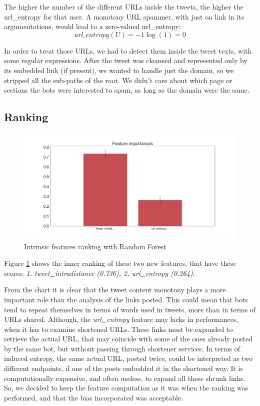 The higher the number of the different URLs inside the tweets, the higher the url\_entropy for that user.
A monotony URL spammer, with just on link in its argumentations, would lead to a zero-valued url\_entropy:
\[url\_entropy(U) = -1\log(1) = 0\]

In order to treat those URLs, we had to detect them inside the tweet texts, with some regular expressions. After the tweet was cleansed and represented only by its embedded link (if present), we wanted to handle just the domain, so we stripped all the sub-paths of the root.
We didn't care about which page or sections the bots were interested to spam, as long as the domain were the same.

\subsection{Ranking}
\begin{figure}[htp!]
	\centering
	\includegraphics[width=\columnwidth]{chapter4/figure/intrinsic_features_importances.png}
	\caption{Intrinsic features ranking with Random Forest}
	\label{fig:intr_rank}
\end{figure}
Figure \ref{fig:intr_rank} shows the inner ranking of these two new features, that have these scores:
\textit{1. tweet\_intradistance (0.736), 2. url\_entropy (0.264)}.

From the chart it is clear that the tweet content monotony plays a more important role than the analysis of the links posted. This could mean that bots tend to repeat themselves in terms of words used in tweets, more than in terms of URLs shared.
Although, the  \textit{url\_entropy} feature may lacks in performances, when it has to examine shortened URLs. These links must be expanded to retrieve the actual URL, that may coincide with some of the ones already posted by the same bot, but without passing through shortener services. In terms of induced entropy, the same actual URL, posted twice, could be interpreted as two different endpoints, if one of the posts embedded it in the shortened way. It is computationally expensive, and often useless, to expand all these shrunk links. So, we decided to keep the feature computation as it was when the ranking was performed, and that the bias incorporated was acceptable.

